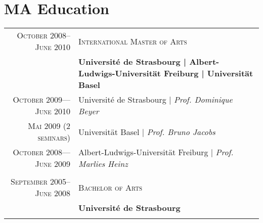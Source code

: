 \section{MA Education}
\begin{longtable}{rl}
\textsc{October 2008--June 2010}  & \textsc{International Master of Arts} \\
& \textbf{Université de Strasbourg | Albert-Ludwigs-Universität Freiburg | Universität Basel} \\ 
 \footnotesize{\textsc{October 2009---June 2010}} &  \footnotesize{Université de Strasbourg | \emph{Prof. Dominique Beyer}}\\
 \footnotesize{\textsc{Mai 2009 (2 seminars)}} &  \footnotesize{Universität Basel | \emph{Prof. Bruno Jacobs}} \\
 \footnotesize{\textsc{October 2008---June 2009}} &   \footnotesize{Albert-Ludwigs-Universität Freiburg | \emph{Prof.  Marlies Heinz}}\\
 &\\

 \textsc{September 2005--June 2008 }  & \textsc{Bachelor of Arts } \\
 &  \small{\textbf{Université de Strasbourg}} \\
 &\\

\end{longtable}
